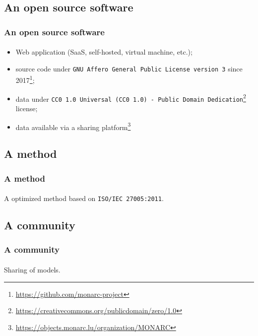 \subsection{An open source software}
\begin{frame}
\frametitle{An open source software}
\framesubtitle{}
    \begin{itemize}
        \item Web application (SaaS, self-hosted, virtual machine, etc.);
        \item source code under \texttt{GNU Affero General Public License version 3} since 2017\footnote{\url{https://github.com/monarc-project}};
        \item data under \texttt{CC0 1.0 Universal (CC0 1.0) - Public Domain Dedication}\footnote{\url{https://creativecommons.org/publicdomain/zero/1.0}} license;
        \item data available via a sharing platform\footnote{\url{https://objects.monarc.lu/organization/MONARC}}
    \end{itemize}
\end{frame}

\subsection{A method}
\begin{frame}
\frametitle{A method}
\framesubtitle{}
    A optimized method based on \texttt{ISO/IEC 27005:2011}.
\end{frame}

\subsection{A community}
\begin{frame}
\frametitle{A community}
\framesubtitle{}
    Sharing of models.
\end{frame}
